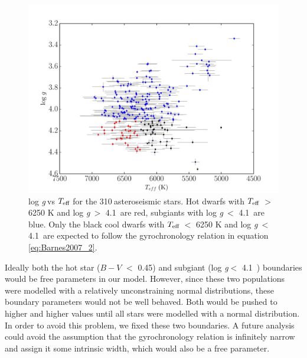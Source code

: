 \documentclass[useAMS, usenatbib]{mn2e}
\newcommand{\logg}{log \emph{g}}
\newcommand{\teff}{$T_{\rm{eff}}$}
\newcommand{\nastero}{310}
\newcommand{\ncooldwarfs}{45~}
\newcommand{\subcut}{4.1~}
\begin{document}
\begin{figure}
\begin{center}
\includegraphics[width=6in, clip=true, trim=0 0 0.5in 0]{logg_vs_t_paper.pdf}
\caption{\logg$~$vs \teff$~$for the \nastero$~$asteroseismic stars. Hot dwarfs
with \teff$~>$ 6250 K and \logg$~>$ \subcut are red, subgiants with \logg$~<$
\subcut are blue. Only the black cool dwarfs with \teff$~<$ 6250 K and
\logg$~<$ \subcut are expected to follow the gyrochronology relation in
equation \ref{eq:Barnes2007_2}.
\label{fig:logg_vs_t}}
\end{center}
\end{figure}


Ideally both the hot star ($B-V$ $<$ 0.45) and subgiant (\logg $<$ \subcut)
boundaries would be free parameters in our model.
However, since these two populations were modelled with a relatively
unconstraining normal distributions, these boundary parameters would not be
well behaved.
Both would be pushed to higher and higher values until all stars were modelled
with a normal distribution.
In order to avoid this problem, we fixed these two boundaries.
A future analysis could avoid the assumption that the gyrochronology relation
is infinitely narrow and assign it some intrinsic width, which would also be
a free parameter.
\end{document}
